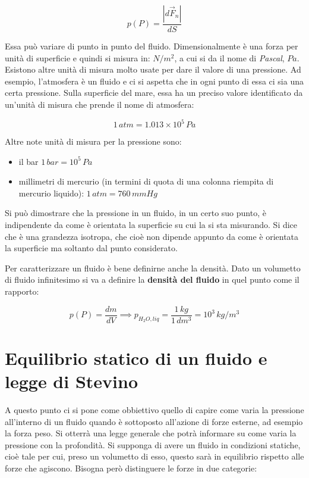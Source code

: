 \[
	p(P) = \frac{|d\vec{F}_n|}{dS}
\]

Essa può variare di punto in punto del fluido. Dimensionalmente è una forza per unità di superficie e quindi si misura in: $N/m^2$, a cui si da il nome di \emph{Pascal}, $Pa$. Esistono altre unità di misura molto usate per dare il valore di una pressione. Ad esempio, l'atmosfera è un fluido e ci si aspetta che in ogni punto di essa ci sia una certa pressione. Sulla superficie del mare, essa ha un preciso valore identificato da un'unità di misura che prende il nome di atmosfera:

\[
	1\,atm = 1.013 \times 10^5\,Pa
\]

Altre note unità di misura per la pressione sono:

\begin{itemize}
	\item il bar $1\,bar = 10^5\,Pa$
	\item millimetri di mercurio (in termini di quota di una colonna riempita di mercurio liquido): $1\,atm = 760\,mmHg$
\end{itemize}

Si può dimostrare che la pressione in un fluido, in un certo suo punto, è indipendente da come è orientata la superficie su cui la si sta misurando. Si dice che è una grandezza isotropa, che cioè non dipende appunto da come è orientata la superficie ma soltanto dal punto considerato.

Per caratterizzare un fluido è bene definirne anche la densità. Dato un volumetto di fluido infinitesimo si va a definire la \textbf{densità del fluido} in quel punto come il rapporto:

\[
	p(P) = \frac{dm}{dV} \implies p_{H_2 O, liq } = \frac{1\,kg}{1\,dm^3 } = 10^3\,kg/m^3
\]

\section{Equilibrio statico di un fluido e legge di Stevino}

A questo punto ci si pone come obbiettivo quello di capire come varia la pressione all'interno di un fluido quando è sottoposto all'azione di forze esterne, ad esempio la forza peso. Si otterrà una legge generale che potrà informare su come varia la pressione con la profondità.
Si supponga di avere un fluido in condizioni statiche, cioè tale per cui, preso un volumetto di esso, questo sarà in equilibrio rispetto alle forze che agiscono. Bisogna però distinguere le forze in due categorie:

